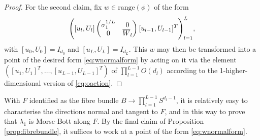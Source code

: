 \documentclass{article}
\newcommand{\bW}{\smash{\overline{W}}\vphantom{W}}
\theoremstyle{plain}
\theoremstyle{definition}
\theoremstyle{remark}
\begin{document}
\begin{proof}
    For the second claim, fix $w\in\mathrm{range}(\phi)$ of the form
    \begin{align}
    \Bigg([u_l,U_l]\begin{pmatrix}\sigma_1^{1/L} & 0 \\ 0 & \bW_l\end{pmatrix}[u_{l-1},U_{l-1}]^T\Bigg)_{l=1}^L,
    \end{align}
    with $[u_0,U_0] = I_{d_0}$ and $[u_L,U_L] = I_{d_L}$. This $w$ may then be transformed into a point of the desired form \eqref{eq:wnormalform} by acting on it via the element $([u_1,U_1]^T,\dots,[u_{L-1},U_{L-1}]^T)$ of $\prod_{l=1}^{L-1}O(d_l)$ according to the 1-higher-dimensional version of \eqref{eq:oaction}.
\end{proof}

With $F$ identified as the fibre bundle $B\rightarrow\prod_{l=1}^{L-1}S^{d_l-1}$, it is relatively easy to characterise the directions normal and tangent to $F$, and in this way to prove that $\lambda_1$ is Morse-Bott along $F$. By the final claim of Proposition \ref{prop:fibrebundle}, it suffices to work at a point of the form \eqref{eq:wnormalform}.
\end{document}

